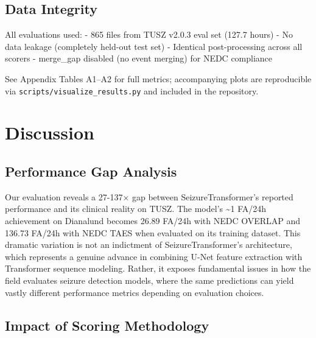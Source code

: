 \documentclass[
  10pt,
]{article}
\begin{document}
\hypertarget{data-integrity}{%
\subsection{Data Integrity}\label{data-integrity}}

All evaluations used: - 865 files from TUSZ v2.0.3 eval set (127.7
hours) - No data leakage (completely held-out test set) - Identical
post-processing across all scorers - merge\_gap disabled (no event
merging) for NEDC compliance

See Appendix Tables A1--A2 for full metrics; accompanying plots are
reproducible via \texttt{scripts/visualize\_results.py} and included in
the repository.



\hypertarget{discussion}{%
\section{Discussion}\label{discussion}}

\hypertarget{performance-gap-analysis}{%
\subsection{Performance Gap Analysis}\label{performance-gap-analysis}}

Our evaluation reveals a 27-137× gap between SeizureTransformer's
reported performance and its clinical reality on TUSZ. The model's
\textasciitilde1 FA/24h achievement on Dianalund becomes 26.89 FA/24h
with NEDC OVERLAP and 136.73 FA/24h with NEDC TAES when evaluated on its
training dataset. This dramatic variation is not an indictment of
SeizureTransformer's architecture, which represents a genuine advance in
combining U-Net feature extraction with Transformer sequence modeling.
Rather, it exposes fundamental issues in how the field evaluates seizure
detection models, where the same predictions can yield vastly different
performance metrics depending on evaluation choices.

\hypertarget{impact-of-scoring-methodology}{%
\subsection{Impact of Scoring
Methodology}\label{impact-of-scoring-methodology}}
\end{document}
